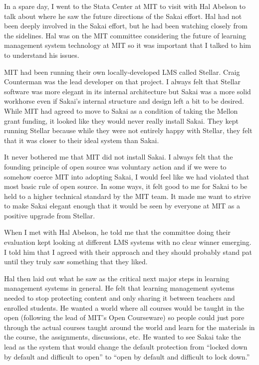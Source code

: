 \documentclass[12pt]{book}
\begin{document}
In a spare day, I went to the Stata Center at MIT
to visit with Hal Abelson to talk about where he
saw the future directions of the Sakai effort.  Hal
had not been deeply involved in the Sakai effort,
but he had been watching closely from the sidelines.
Hal was on the MIT committee considering the future
of learning management system technology at MIT
so it was important that I talked to him to
understand his issues.

MIT had been running their own locally-developed
LMS called Stellar.  Craig Counterman was the
lead developer on that project.  I always felt that
Stellar software was more elegant in its internal
architecture but Sakai was a more solid workhorse
even if Sakai's internal structure and design left a bit
to be desired.  While MIT had agreed to move to Sakai
as a condition of taking the Mellon grant funding,
it looked like they would never really install Sakai.
They kept running Stellar because while they were
not entirely happy with Stellar, they felt that
it was closer to their ideal system than Sakai.

It never bothered me that
MIT did not install Sakai.
I always felt that the founding principle of
open source was voluntary action and if we were to
somehow coerce MIT into adopting Sakai, I would
feel like we had violated that most basic rule of
open source.  In some ways, it felt good to me for
Sakai to be held to a higher technical standard
by the MIT team.  It made me want to strive to make Sakai
elegant enough
that it would be seen by everyone at MIT as a positive
upgrade from Stellar.

When I met with Hal Abelson, he told me that the committee
doing their evaluation kept looking at different LMS systems
with no clear winner emerging.
I told him that I agreed with their
approach and they should probably stand pat until they
truly saw something that they liked.

Hal then laid out what he saw as the critical next
major steps in learning management systems in general.
He felt that learning management systems needed to stop
protecting content and only sharing it between teachers
and enrolled students.  He wanted a world where all
courses would be taught in the open (following the lead
of MIT's Open Courseware) so people could just pore through
the actual courses taught around the world and learn
for the materials in the course, the assignments,
discussions, etc.   He wanted to see Sakai take the lead
as the system that would change the default protection
from ``locked down by default and difficult to open'' to
``open by default and difficult to lock down.''
\end{document}

